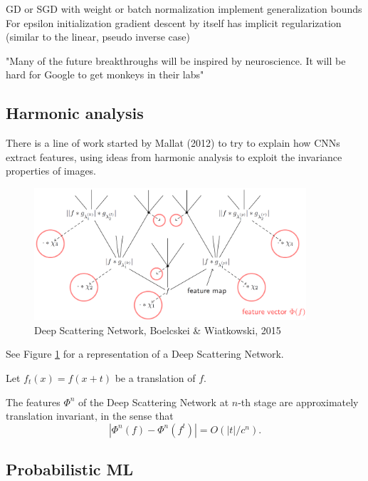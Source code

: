 \documentclass[english]{article}
\begin{document}
GD or SGD with weight or batch normalization implement generalization bounds For epsilon initialization gradient descent by itself has implicit regularization (similar to the linear, pseudo inverse case)

"Many of the future breakthroughs will be inspired by neuroscience. It will be hard for Google to get monkeys in their labs"

\eenum

\eenum




\subsection{Harmonic analysis}

There is a line of work started by Mallat (2012) to try to explain how CNNs extract features, using ideas from harmonic analysis to exploit the invariance properties of images. 

\begin{figure}
  \centering
  \includegraphics[width=0.9\textwidth]{s.png}
  \caption{Deep Scattering Network, Boelcskei \& Wiatkowski, 2015}
  \label{dsn}
\end{figure}

See Figure \ref{dsn} for a representation of a Deep Scattering Network. 


\begin{theorem}
Let $f_t(x) = f(x+t)$ be a translation of $f$. 

The features $\Phi^n$ of the Deep Scattering Network at $n$-th stage are approximately translation invariant, in the sense that $$|\Phi^n(f) - \Phi^n(f^t)| = O(|t|/c^n).$$
\end{theorem}
%
%
%

\subsection{Probabilistic ML}
\end{document}
